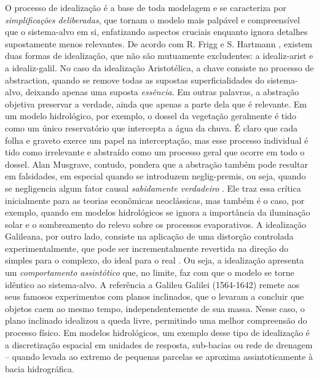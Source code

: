 \documentclass[./main.tex]{subfiles}
\begin{document}
\par O processo de idealização é a base de toda modelagem e se caracteriza por \textit{simplificações deliberadas}, que tornam o modelo mais palpável e compreensível que o sistema-alvo em si, enfatizando aspectos cruciais enquanto ignora detalhes supostamente menos relevantes. De acordo com R. Frigg e S. Hartmann \cite{sep-models-science}, existem duas formas de idealização, que não são mutuamente excludentes: a \gls{idealiz-arist} e a \gls{idealiz-galil}. No caso da idealização Aristotélica, a chave consiste no processo de \gls{abstraction}, quando se remove todas as supostas superficialidades do sistema-alvo, deixando apenas uma suposta \textit{essência}. Em outras palavras, a abstração objetiva preservar a verdade, ainda que apenas a parte dela que é relevante. Em um modelo hidrológico, por exemplo, o dossel da vegetação geralmente é tido como um único reservatório que intercepta a água da chuva. É claro que cada folha e graveto exerce um papel na interceptação, mas esse processo individual é tido como irrelevante e abstraído como um processo geral que ocorre em todo o dossel. Alan Musgrave, contudo, pondera que a abstração também pode resultar em falsidades, em especial quando se introduzem \gls{neglig-premis}, ou seja, quando se negligencia algum fator causal \textit{sabidamente verdadeiro} \cite{musgrave1981}. Ele traz essa crítica inicialmente para as teorias econômicas neoclássicas, mas também é o caso, por exemplo, quando em modelos hidrológicos se ignora a importância da iluminação solar e o sombreamento do relevo sobre os processos evaporativos. A idealização Galileana, por outro lado, consiste na aplicação de uma distorção controlada experimentalmente, que pode ser incrementalmente revertida na direção do simples para o complexo, do ideal para o real \cite{MCMULLIN1985}. Ou seja, a idealização apresenta um \textit{comportamento assintótico} que, no limite, faz com que o modelo se torne idêntico ao sistema-alvo. A referência a Galileu Galilei (1564-1642) remete aos seus famosos experimentos com planos inclinados, que o levaram a concluir que objetos caem ao mesmo tempo, independentemente de sua massa. Nesse caso, o plano inclinado idealizou a queda livre, permitindo uma melhor compreensão do processo físico. Em modelos hidrológicos, um exemplo desse tipo de idealização é a discretização espacial em unidades de resposta, sub-bacias ou rede de drenagem – quando levada ao extremo de pequenas parcelas se aproxima assintoticamente à bacia hidrográfica.
\end{document}
